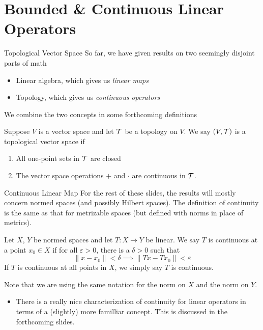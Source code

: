 \documentclass[10pt]{beamer}
\begin{document}
		\section{Bounded \& Continuous Linear Operators}

		\begin{frame}{Topological Vector Space}
				So far, we have given results on two seemingly disjoint parts of math 
				\begin{itemize}
						\item Linear algebra, which gives us \emph{linear maps}
						\item Topology, which gives us \emph{continuous operators}
				\end{itemize}
				We combine the two concepts in some forthcoming definitions 
				\begin{definition}
						Suppose $V$ is a vector space and let $\mathcal{T}$ be a topology on $V$. We say $(V, \mathcal{T})$ is a \alert{topological vector space} if 
						\begin{enumerate}
								\item All one-point sets in $\mathcal{T}$ are closed 
								\item The vector space operations $+$ and $\cdot$ are continuous in $\mathcal{T}$.
						\end{enumerate}
				\end{definition}
		\end{frame}

		\begin{frame}{Continuous Linear Map}
				For the rest of these slides, the results will mostly concern normed spaces (and possibly Hilbert spaces). The definition of continuity is the same as that for metrizable spaces (but defined with norms in place of metrics). 
				\begin{definition}
						Let $X$, $Y$ be normed spaces and let $T: X\to Y$ be linear. We say $T$ is \alert{continuous} at a point $x_0\in X$ if for all $\varepsilon > 0$, there is a $\delta > 0$ such that 
						\begin{equation*}
								\| x - x_0 \| < \delta \implies \|Tx - Tx_0\| < \varepsilon
						\end{equation*}
						If $T$ is continuous at all points in $X$, we simply say $T$ is \alert{continuous}.
				\end{definition}
				Note that we are using the same notation for the norm on $X$ and the norm on $Y$. 
				\begin{itemize}
						\item<2-> There is a really nice characterization of continuity for linear operators in terms of a (slightly) more familliar concept. This is discussed in the forthcoming slides. 
				\end{itemize}
		\end{frame}
\end{document}
